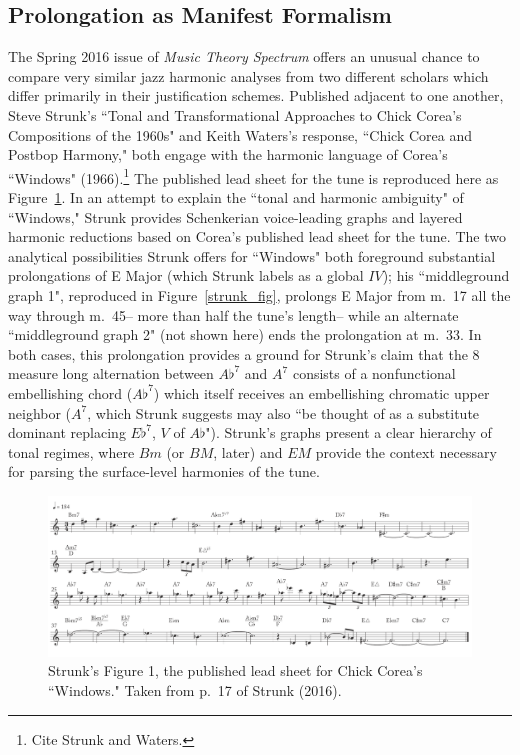 \subsection{Prolongation as Manifest Formalism}

The Spring 2016 issue of \emph{Music Theory Spectrum} offers an unusual chance to compare very similar jazz harmonic analyses from two different scholars which differ primarily in their justification schemes.  Published adjacent to one another, Steve Strunk's ``Tonal and Transformational Approaches to Chick Corea's Compositions of the 1960s" and Keith Waters's response, ``Chick Corea and Postbop Harmony," both engage with the harmonic language of Corea's ``Windows" (1966).\footnote{Cite Strunk and Waters.}  The published lead sheet for the tune is reproduced here as Figure~\ref{windows}.  In an attempt to explain the ``tonal and harmonic ambiguity" of ``Windows," Strunk provides Schenkerian voice-leading graphs and layered harmonic reductions based on Corea's published lead sheet for the tune.  The two analytical possibilities Strunk offers for ``Windows" both foreground substantial prolongations of E Major (which Strunk labels as a global $IV$); his ``middleground graph 1", reproduced in Figure~\ref{strunk_fig}, prolongs E Major from m.\ 17 all the way through m.\ 45-- more than half the tune's length-- while an alternate ``middleground graph 2" (not shown here) ends the prolongation at m.\ 33.  In both cases, this prolongation provides a ground for Strunk's claim that the 8 measure long alternation between $A\flat^7$ and $A^7$ consists of a nonfunctional embellishing chord ($A\flat^7$) which itself receives an embellishing chromatic upper neighbor ($A^7$, which Strunk suggests may also ``be thought of as a substitute dominant replacing $E\flat^7$, $V$ of $A\flat$").  Strunk's graphs present a clear hierarchy of tonal regimes, where $Bm$ (or $BM$, later) and $EM$ provide the context necessary for parsing the surface-level harmonies of the tune.

\begin{figure}
	\centering
	\caption{Strunk's Figure 1, the published lead sheet for Chick Corea's ``Windows."  Taken from p.\ 17 of Strunk (2016).}\label{windows}
	\includegraphics[width=6in]{strunk_windows.png}	
\end{figure}

